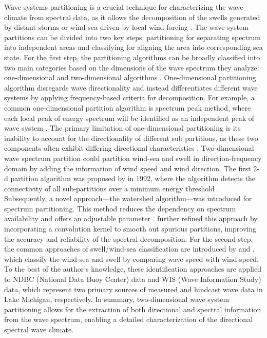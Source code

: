 Wave systems partitioning is a crucial technique for characterizing the wave
climate from spectral data, as it allows the decomposition of the swells
generated by distant storms or wind-sea driven by local wind forcing
\citep{jiang_wave_2019,portilla-yandun_wave_2015}. The wave system partitions
can be divided into two key steps: partitioning for separating spectrum into
independent areas and classifying for aligning the area into corresponding sea
state. For the first step, the partitioning algorithms can be broadly classified
into two main categories based on the dimensions of the wave spectrum they
analyze: one-dimensional and two-dimensional algorithms
\citep{portilla_spectral_2009}. One-dimensional partitioning algorithm
disregards wave directionality and instead differentiates different wave systems
by applying frequency-based criteria for decomposition. For example, a common
one-dimensional partition algorithm is spectrum peak method, where each local
peak of energy spectrum will be identified as an independent peak of wave system
\citep{portilla_spectral_2009,violante-carvalho_growth_2001,voorrips_assimilation_1997}.
The primary limitation of one-dimensional partitioning is its inability to
account for the directionality of different sub partitions, as these two
components often exhibit differing directional characteristics
\citep{george_nearshore_2020}. Two-dimensional wave spectrum partition could
partition wind-sea and swell in direction-frequency domain by adding the
information of wind speed and wind direction. The first 2-d partition algorithm
was proposed by \citet{gerling_partitioning_1992} in 1992, where the algorithm
detects the connectivity of all sub-partitions over a minimum energy threshold
\citep{gerling_partitioning_1992}. Subsequently, a novel approach—the watershed
algorithm—was introduced for spectrum partitioning. This method reduces the
dependency on spectrum availability \citep{hasselmann_improved_1996} and offers
an adjustable parameter \citep{hanson_automated_2001}.
\citet{portilla_spectral_2009} further refined this approach by incorporating a
convolution kernel to smooth out spurious partitions, improving the accuracy and
reliability of the spectral decomposition. For the second step, the common
approaches of swell/wind-sea classification are introduced by
\citet{komen_existence_1984} and \citet{jensen_lake_2012}, which classify the
wind-sea and swell by comparing wave speed with wind speed. To the best of the
author's knowledge, these identification approaches are applied to NDBC
(National Data Buoy Center) data and WIS (Wave Information Study) data, which
represent two primary sources of measured and hindcast wave data in Lake
Michigan, respectively. In summary, two-dimensional wave system partitioning
allows for the extraction of both directional and spectral information from the
wave spectrum, enabling a detailed characterization of the directional spectral
wave climate.

